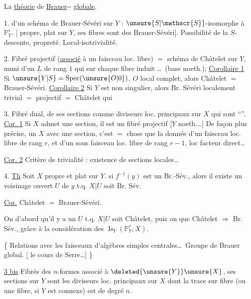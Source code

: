 La \uline{théorie} de \uline{Brauer}-\uline{}-\uline{} \uline{globale}.

1.  d'un schéma de Brauer-Sévéri sur $Y$ :  $\unsure{S|\mathscr{S}}$-isomorphe à $\mathbb{P}^{r}_{Y}$.  [ propre, plat sur $Y$, ses fibres sont des Brauer-Sévéri]. Possibilité de la $S$-descente, propreté. Local-isotrivialité.

2. Fibré projectif (\uline{associé} à un faisceau loc. libre) $=$ schéma de Châtelet sur $Y$,  muni d'un $\underline{L}$ de rang $1$ qui sur chaque fibre induit \ldots\ (base noeth.); \uline{Corollaire 1} Si $\unsure{Y|S}=\operatorname{Spec}(\unsure{O|0})$, $O$ local complet, alors Châtelet $=$ Brauer-Sévéri. \uline{Corollaire 2} Si $Y$ est non singulier, alors Br. Sévéri localement trivial $=$  projectif $=$ Châtelet qui  

3. Fibré dual,  de ses sections comme diviseurs loc. principaux sur $X$ qui sont ``''. \uline{Cor. 1} Si $X$ admet une section, il est un fibré projectif [$Y$ noeth.\ldots] De façon plus précise, un $X$  avec une section, c'est  $=$ chose que la donnée d'un  faisceau loc. libre de rang $r$, et d'un sous faisceau loc. libre de rang $r-1$, loc facteur direct\ldots

\uline{Cor. 2}  Critère de  trivialité : existence de sections locales\ldots

4. \uline{Th} Soit $X$ propre et plat sur $Y$.  si $f^{-1}(y)$ est un Br.-Sév., alors il existe un voisinage ouvert $U$ de $y$ t.q. $X|U$ soit Br. Sév.

\uline{Cor.} Châtelet $=$ Brauer-Sévéri.

On  d'abord qu'il y a un $U$ t.q. $X|U$ soit Châtelet, puis on   que Châtelet $\Rightarrow$ Br. Sév., grâce à la considération des $\operatorname{Is}_{Y}(\mathbb{P}^{r}_{Y},X)$.

\{ Relations avec les faisceaux d'algèbres simples centrales\ldots\ Groupe de Brauer global. [ le cours de Serre\ldots] \}

\uline{3 bis} Fibrés des $n$-formes associé à $\deleted{\unsure{Y}}\unsure{X}$, ses sections sur $Y$ sont les diviseurs loc. principaux sur $X$ dont la trace sur  fibre (ou une fibre, si $Y$ est connexe) est de degré $n$.
